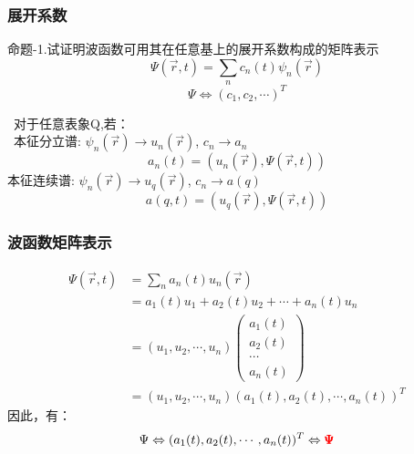 \begin{frame} 
    \frametitle{展开系数}   
    \begin{exampleblock}{命题-1.试证明波函数可用其在任意基上的展开系数构成的矩阵表示}
        $$ \Psi(\vec{r},t)=\sum_n c_n(t) \psi_n(\vec{r})$$ 
        $$ \Psi\Leftrightarrow(c_1,c_2,\cdots)^T $$   
    \end{exampleblock}
    \证 ~对于任意表象Q,若：\\
     本征分立谱: $\psi_n(\vec{r}) \to u_n(\vec{r})$, $c_n \to a_n $
        \begin{equation*}
            a_n(t)=(u_n(\vec{r}), \Psi(\vec{r},t)) 
        \end{equation*}  
    本征连续谱: $\psi_n(\vec{r}) \to u_q(\vec{r})$, $c_n \to a(q) $
        \begin{equation*}
            a(q,t)=(u_q(\vec{r}), \Psi(\vec{r},t)) 
        \end{equation*}  
\end{frame} 

\begin{frame} 
        \frametitle{波函数矩阵表示} 
        \begin{equation*}
            \begin{split} 
                \Psi(\vec{r},t)&=\sum_n a_n(t) u_n(\vec{r}) \\
                &=a_1(t) u_1+ a_2(t) u_2+\cdots+ a_n(t) u_n \\
                &=(u_1,u_2,\cdots,u_n) 
               \begin{pmatrix}
                    a_1(t)\\
                    a_2(t)\\
                    \cdots\\
                    a_n(t)
                \end{pmatrix} \\
                &= (u_1,u_2,\cdots,u_n) (a_1(t),a_2(t),\cdots, a_n(t))^T
            \end{split}  
        \end{equation*}  
        因此，有： $$   \Psi \Leftrightarrow (a_1(t),a_2(t),\cdots, a_n(t))^T \Leftrightarrow {\color{red}  \pmb {\Psi} } $$
\end{frame}

